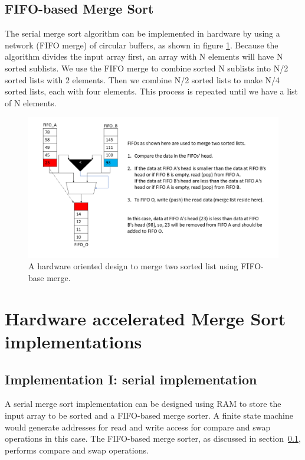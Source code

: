 \documentclass{article}
\begin{document}
\subsection{FIFO-based Merge Sort}
\label{subsec:FIFO-based Merge Sort}

The serial merge sort algorithm can be implemented in hardware by using a network (FIFO merge) of circular buffers, as shown in figure \ref{fig:fifo_nwk}. Because the algorithm divides the input array first, an array with N elements will have N sorted sublists. We use the FIFO merge to combine sorted N sublists into N/2 sorted lists with 2 elements. Then we combine N/2 sorted lists to make N/4 sorted lists, each with four elements. This process is repeated until we have a list of N elements.


\begin{figure}[H]
\centering
\includegraphics[width=1.00\textwidth]{fifo_nwk.PNG}
\caption{\label{fig:fifo_nwk}A hardware oriented design to merge two sorted list using FIFO-base merge.}
\end{figure}



\section{Hardware accelerated Merge Sort implementations}
\subsection{Implementation I: serial implementation}
\label{subsec:Implementation I}
A serial merge sort implementation can be designed using RAM to store the input array to be sorted and a FIFO-based merge sorter. A finite state machine would generate addresses for read and write access for compare and swap operations in this case. The FIFO-based merge sorter, as discussed in section~\ref{subsec:FIFO-based Merge Sort}, performs compare and swap operations.
\end{document}
